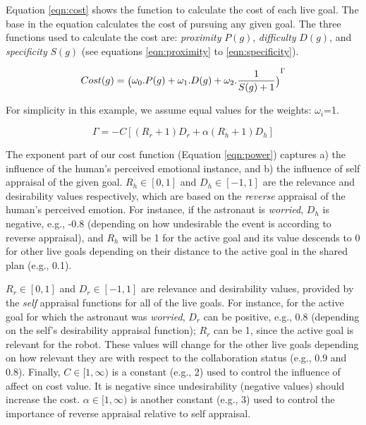 \documentclass[12pt]{report}
\begin{document}
Equation \ref{eqn:cost} shows the function to calculate the cost of each
live goal. The base in the equation calculates the cost of pursuing any given
goal. The three functions used to calculate the cost are:
\textit{proximity} $P(g)$, \textit{difficulty} $D(g)$, and \textit{specificity}
$S(g)$ (see equations \ref{eqn:proximity} to \ref{eqn:specificity}).

\begin{equation}
{\fontsize{6}{9}\selectfont Cost(g) =
\big(\omega_0.P(g)+\omega_1.D(g)+\omega_2.\frac{1}{S(g)+1}\big)}^{\Gamma}
\label{eqn:cost}
\end{equation}

\noindent For simplicity in this example, we assume equal values for the
weights:
$\omega_i$=1.

\begin{equation}
\Gamma=-C[(R_r+1)D_r + \alpha(R_h+1)D_h]
\label{eqn:power}
\end{equation}

The exponent part of our cost function (Equation \ref{eqn:power}) captures a)
the influence of the human's perceived emotional instance, and b) the influence
of self appraisal of the given goal. $R_h\in[0,1]$ and $D_h\in[-1,1]$ are the
relevance and desirability values respectively, which are based on the
\textit{reverse} appraisal of the human's perceived emotion. For instance, if
the astronaut is \textit{worried}, $D_h$ is negative, e.g., -0.8 (depending on
how undesirable the event is according to reverse appraisal), and $R_h$ will be
1 for the active goal and its value descends to 0 for other live goals depending
on their distance to the active goal in the shared plan (e.g., 0.1).

$R_r\in[0,1]$ and $D_r\in[-1,1]$ are relevance and desirability values, provided
by the \textit{self} appraisal functions for all of the live goals. For
instance, for the active goal for which the astronaut was \textit{worried},
$D_r$ can be positive, e.g., 0.8 (depending on the self's desirability appraisal
function); $R_r$ can be 1, since the active goal is relevant for the robot.
These values will change for the other live goals depending on how
relevant they are with respect to the collaboration status (e.g., 0.9 and 0.8).
Finally, $C\in[1,\infty)$ is a constant (e.g., 2) used to control the influence
of affect on cost value. It is negative since undesirability (negative values)
should increase the cost. $\alpha\in[1,\infty)$ is another constant (e.g., 3)
used to control the importance of reverse appraisal relative to self appraisal.
\end{document}
